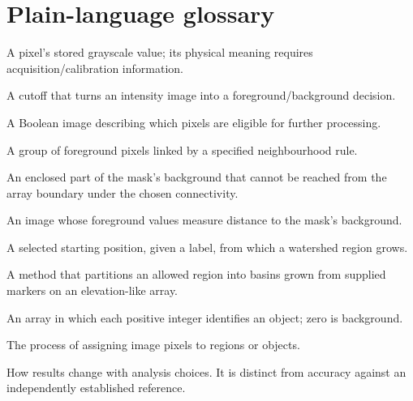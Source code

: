 \documentclass[11pt,letterpaper]{article}
\begin{document}
\section{Plain-language glossary}
\begin{description}[style=nextline]
\item[Intensity] A pixel's stored grayscale value; its physical meaning requires acquisition/calibration information.
\item[Threshold] A cutoff that turns an intensity image into a foreground/background decision.
\item[Mask] A Boolean image describing which pixels are eligible for further processing.
\item[Connected component] A group of foreground pixels linked by a specified neighbourhood rule.
\item[Hole] An enclosed part of the mask's background that cannot be reached from the array boundary under the chosen connectivity.
\item[Distance transform] An image whose foreground values measure distance to the mask's background.
\item[Seed or marker] A selected starting position, given a label, from which a watershed region grows.
\item[Watershed] A method that partitions an allowed region into basins grown from supplied markers on an elevation-like array.
\item[Label image] An array in which each positive integer identifies an object; zero is background.
\item[Segmentation] The process of assigning image pixels to regions or objects.
\item[Sensitivity] How results change with analysis choices. It is distinct from accuracy against an independently established reference.
\end{description}
\end{document}
